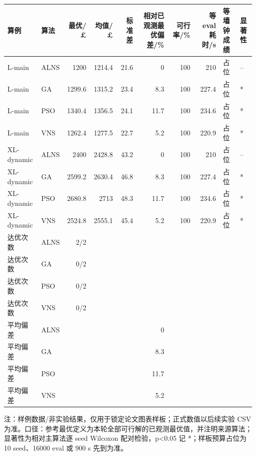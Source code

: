 \begin{tabular}{@{}llrrrrrrll@{}}
\toprule
算例 & 算法 & 最优/£ & 均值/£ & 标准差 & 相对已观测最优偏差/\% & 可行率/\% & 等eval耗时/s & 等墙钟成绩 & 显著性\\
\midrule
L-main & ALNS & 1200 & 1214.4 & 21.6 & 0 & 100 & 210 & 占位 & --\\
L-main & GA & 1299.6 & 1315.2 & 23.4 & 8.3 & 100 & 227.4 & 占位 & *\\
L-main & PSO & 1340.4 & 1356.5 & 24.1 & 11.7 & 100 & 234.6 & 占位 & *\\
L-main & VNS & 1262.4 & 1277.5 & 22.7 & 5.2 & 100 & 220.9 & 占位 & *\\
XL-dynamic & ALNS & 2400 & 2428.8 & 43.2 & 0 & 100 & 210 & 占位 & --\\
XL-dynamic & GA & 2599.2 & 2630.4 & 46.8 & 8.3 & 100 & 227.4 & 占位 & *\\
XL-dynamic & PSO & 2680.8 & 2713 & 48.3 & 11.7 & 100 & 234.6 & 占位 & *\\
XL-dynamic & VNS & 2524.8 & 2555.1 & 45.4 & 5.2 & 100 & 220.9 & 占位 & *\\
\midrule
达优次数 & ALNS & 2/2 &  &  &  &  &  &  & \\
达优次数 & GA & 0/2 &  &  &  &  &  &  & \\
达优次数 & PSO & 0/2 &  &  &  &  &  &  & \\
达优次数 & VNS & 0/2 &  &  &  &  &  &  & \\
平均偏差 & ALNS &  &  &  & 0 &  &  &  & \\
平均偏差 & GA &  &  &  & 8.3 &  &  &  & \\
平均偏差 & PSO &  &  &  & 11.7 &  &  &  & \\
平均偏差 & VNS &  &  &  & 5.2 &  &  &  & \\
\bottomrule
\end{tabular}
\par\footnotesize 注：样例数据/非实验结果，仅用于锁定论文图表样板；正式数值以后续实验 CSV 为准。口径：参考最优定义为本轮全部可行解的已观测最优值，并注明来源算法；显著性为相对主算法逐 seed Wilcoxon 配对检验，p<0.05 记 *；样板预算占位为 10 seed、16000 eval 或 900 s 先到为准。
